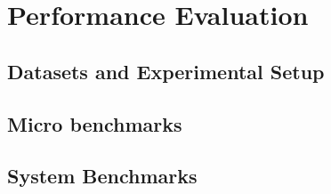 \section{Performance Evaluation}
\label{sec:performance}
\subsection{Datasets and Experimental Setup}

\subsection{Micro benchmarks}

\subsection{System Benchmarks}


